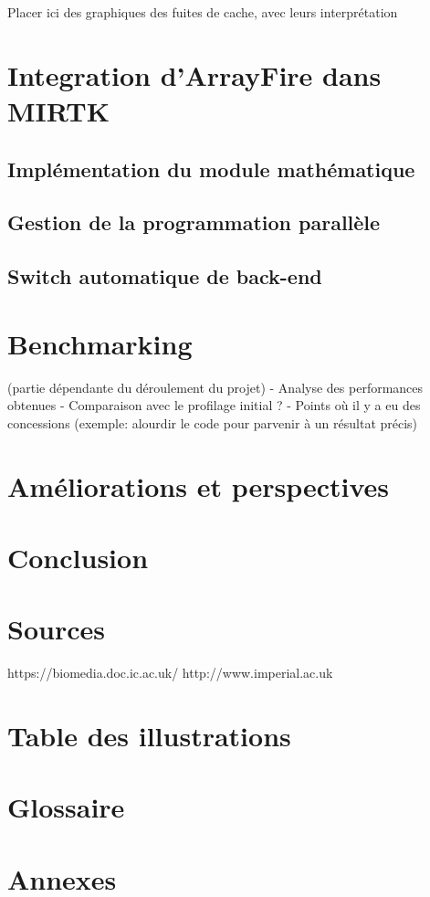 \documentclass[10pt]{report}
\begin{document}
	Placer ici des graphiques des fuites de cache, avec leurs interprétation
	
	\section{Integration d'ArrayFire dans MIRTK}
	\subsection{Implémentation du module mathématique}
	\subsection{Gestion de la programmation parallèle}
	\subsection{Switch automatique de back-end}
	\section{Benchmarking}
	(partie dépendante du déroulement du projet)\newline
	- Analyse des performances obtenues \newline
	- Comparaison avec le profilage initial ? \newline
	- Points où il y a eu des concessions (exemple: alourdir le code pour parvenir à un résultat précis)
	
	\section{Améliorations et perspectives}
	
\section*{Conclusion} %
\section*{Sources}
https://biomedia.doc.ic.ac.uk/
http://www.imperial.ac.uk
\section*{Table des illustrations}
\section*{Glossaire}

\section*{Annexes}
\end{document}
